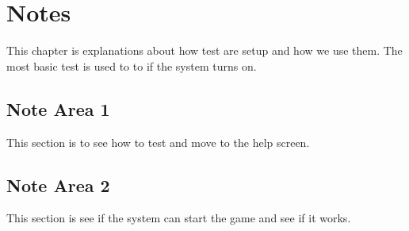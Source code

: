 
\chapter{Notes}
\label{loc:Notes}


This chapter is explanations about how test are setup and how we use them. The most basic test is used to to if the system turns on.

\section{Note Area 1}
\label{loc:Notes_1}


This section is to see how to test and move to the help screen.

\section{Note Area 2}
\label{loc:Notes_2}


This section is see if the system can start the game and see if it works.

